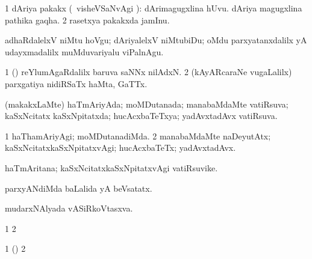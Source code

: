 {\bentry
{} 
\gl{\nA}
\expl{}
\bmng
\bnum
\num{1} dAriya pakakx (\kanmu\ visheVSaNvAgi \parx):  dArimagugxlina hUvu.  dAriya magugxlina pathika gaqha. 
\num{2} rasetxya pakakxda jamInu. 
\enum
\emng

\noindent
\gl{\pagu}
\expl{}
\bmng
{} adhaRdalelxV niMtu hoVgu; dAriyalelxV niMtubiDu; oMdu parxyatanxdalilx yA udayxmadalilx muMduvariyalu viPalnAgu. 
\emng
\eentry

\bentry
{} 
\gl{\nA}
\expl{}
\bmng
\bnum
\num{1} (\ame) reYlumAgaRdalilx baruva saNNx nilAdxN. 
\num{2} (kAyARcaraNe \mo vugaLalilx) parxgatiya nidiRSaTx haMta, GaTTx. 
\enum
\emng
\eentry

\bentry
{} 
\gl{\gu}
\expl{}
\bmng
(makakxLaMte) haTmAriyAda; moMDutanada; manabaMdaMte vatiRsuva; kaSxNcitatx kaSxNpitatxda; hucAcxbaTeTxya; yadAvxtadAvx vatiRsuva. 
\emng
\eentry

\bentry
{} 
\gl{\kirxvi}
\expl{}
\bmng
\bnum
\num{1} haThamAriyAgi; moMDutanadiMda. 
\num{2} manabaMdaMte naDeyutAtx; kaSxNcitatxkaSxNpitatxvAgi; hucAcxbaTeTx; yadAvxtadAvx. 
\enum
\emng
\eentry

\bentry
{} 
\gl{\nA}
\expl{}
\bmng
haTmAritana; kaSxNcitatxkaSxNpitatxvAgi vatiRsuvike. 
\emng
\eentry

\bentry
{} 
\gl{\gu}
\expl{}
\bmng
parxyANdiMda baLalida yA beVsatatx. 
\emng
\eentry

\bentry
{} 
\gl{\nA}
\bmng
mudarxNAlyada vASiRkoVtasxva. 
\emng
\eentry

\bentry
{} 
\gl{\saMkiSx}
\expl{}
\bmng
{} 
\emng
\eentry

\bentry
{} 
\gl{\saMkiSx}
\expl{}
\bmng
\bnum
\num{1}  
\num{2}  
\enum
\emng
\eentry

\bentry
{} 
\gl{\saMkiSx}
\expl{}
\bmng
{} 
\emng
\eentry

\bentry
{} 
\gl{\saMkiSx}
\expl{}
\bmng
{} 
\emng
\eentry

\bentry
{} 
\gl{\saMkiSx}
\expl{}
\bmng
\bnum
\num{1} (\birx)  
\num{2}  
\enum
\emng
\eentry

}
